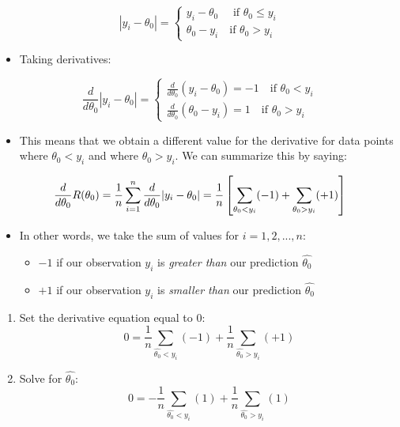 \documentclass[
  letterpaper,
  DIV=11,
  numbers=noendperiod]{scrreprt}
\providecommand{\tightlist}{%
  \setlength{\itemsep}{0pt}\setlength{\parskip}{0pt}}\usepackage{longtable,booktabs,array}
\begin{document}
\[|y_i - \theta_0| = \begin{cases} y_i - \theta_0 \quad \text{ if } \theta_0 \le y_i \\ \theta_0 - y_i \quad \text{if }\theta_0 > y_i \end{cases}\]

\begin{itemize}
\tightlist
\item
  Taking derivatives:
\end{itemize}

\[\frac{d}{d\theta_0} |y_i - \theta_0| = \begin{cases} \frac{d}{d\theta_0} (y_i - \theta_0) = -1 \quad \text{if }\theta_0 < y_i \\ \frac{d}{d\theta_0} (\theta_0 - y_i) = 1 \quad \text{if }\theta_0 > y_i \end{cases}\]

\begin{itemize}
\tightlist
\item
  This means that we obtain a different value for the derivative for
  data points where \(\theta_0 < y_i\) and where \(\theta_0 > y_i\). We
  can summarize this by saying:
\end{itemize}

\[
\frac{d}{d\theta_0} R(\theta_0) = \frac{1}{n} \sum^{n}_{i=1} \frac{d}{d\theta_0} |y_i - \theta_0| \\
= \frac{1}{n} \left[\sum_{\theta_0 < y_i} (-1) + \sum_{\theta_0 > y_i} (+1) \right]
\]

\begin{itemize}
\tightlist
\item
  In other words, we take the sum of values for \(i = 1, 2, ..., n\):

  \begin{itemize}
  \tightlist
  \item
    \(-1\) if our observation \(y_i\) is \emph{greater than} our
    prediction \(\hat{\theta_0}\)
  \item
    \(+1\) if our observation \(y_i\) is \emph{smaller than} our
    prediction \(\hat{\theta_0}\)
  \end{itemize}
\end{itemize}

\begin{enumerate}
\def\labelenumi{\arabic{enumi}.}
\setcounter{enumi}{1}
\item
  Set the derivative equation equal to 0:
  \[ 0 = \frac{1}{n}\sum_{\hat{\theta_0} < y_i} (-1) + \frac{1}{n}\sum_{\hat{\theta_0} > y_i} (+1) \]
\item
  Solve for \(\hat{\theta_0}\):
  \[ 0 = -\frac{1}{n}\sum_{\hat{\theta_0} < y_i} (1) + \frac{1}{n}\sum_{\hat{\theta_0} > y_i} (1)\]
\end{enumerate}
\end{document}
